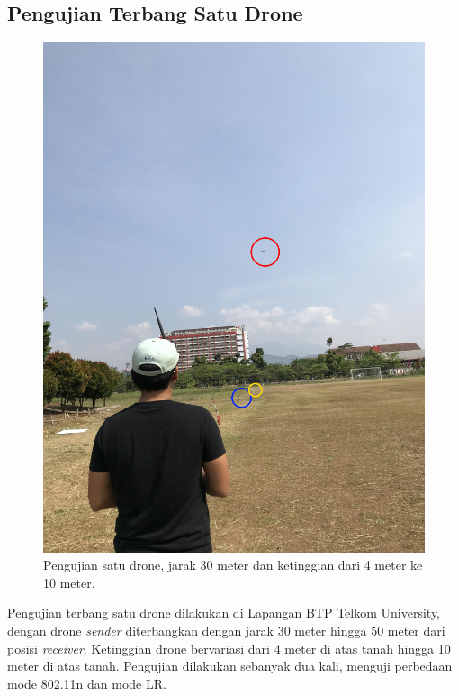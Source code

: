 \subsection{Pengujian Terbang Satu Drone}
\begin{figure}[H]
	\centering
	\includegraphics[scale=0.05]{./assets/Pengujian/PengujianSatuDrone/Sender}
	\caption{Pengujian satu drone, jarak 30 meter dan ketinggian dari 4 meter ke 10 meter.}
\end{figure}
Pengujian terbang satu drone dilakukan di Lapangan BTP Telkom University, dengan drone \textit{sender} diterbangkan dengan jarak 30 meter hingga 50 meter dari posisi \textit{receiver}. Ketinggian drone bervariasi dari 4 meter di atas tanah hingga 10 meter di atas tanah. Pengujian dilakukan sebanyak dua kali, menguji perbedaan mode 802.11n dan mode LR.


